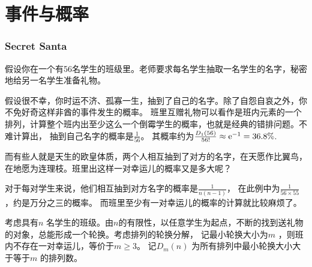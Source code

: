 \chapter{事件与概率}

\subsection{Secret Santa}

假设你在一个有56名学生的班级里。老师要求每名学生抽取一名学生的名字，秘密地给另一名学生准备礼物。

假设很不幸，你时运不济、孤寡一生，抽到了自己的名字。除了自怨自哀之外，你不免好奇这样非酋的事件发生的概率。
班里互赠礼物可以看作是班内元素的一个排列，计算整个班内出至少这么一个倒霉学生的概率，也就是经典的错排问题。不难计算出，
抽到自己名字的概率是\(\frac{1}{56}\)。
其概率约为\(\frac{D_{1}(56)}{56!}\approx \mathrm{e}^{-1} =36.8\%\).

而有些人就是天生的欧皇体质，两个人相互抽到了对方的名字，在天愿作比翼鸟，在地愿为连理枝。班里出这样一对幸运儿的概率又是多大呢？

对于每对学生来说，他们相互抽到对方名字的概率是\(\frac{1}{n(n-1)}\)，
在此例中为\(\frac{1}{56 \times 55}\)，约是万分之三的概率。
而班里至少有一对幸运儿的概率的计算就比较麻烦了\cite[p.~24]{arndt2010generating}。

考虑具有\(n\) 名学生的班级。由\(n\)的有限性，以任意学生为起点，不断的找到送礼物的对象，总能形成一个轮换。考虑排列的轮换分解，
记最小轮换大小为\(m\) ，则班内不存在一对幸运儿，等价于\(m\geq 3\)。
记\(D_{m}(n)\) 为所有排列中最小轮换大小大于等于\(m\) 的排列数。

